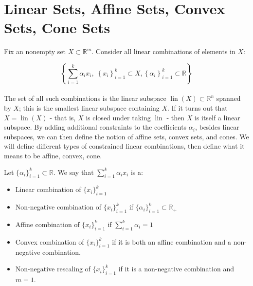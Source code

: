 \section{Linear Sets, Affine Sets, Convex Sets, Cone Sets}
\label{sect:011}

\paragraph{}Fix an nonempty set $X\subset \mathbb{R}^m$. Consider all linear combinations of elements in $X$:

\[
	\left\{\sum_{i=1}^k \alpha_i x_i,\; \left\{ x_i \right\}_{i=1}^k \subset X, \left\{\alpha_i\right\}_{i=1}^k\subset \mathbb{R}\right\}
\]

\paragraph{}The set of all such combinations is the linear subspace $\operatorname{lin}(X)\subset \mathbb{R}^n$ spanned by $X$; this is the smallest linear subspace containing $X$. If it turns out that $X=\operatorname{lin}(X)$ - that is, $X$ is closed under taking $\operatorname{lin}$ - then $X$ is itself a linear subspace. By adding additional constraints to the coefficients $\alpha_i$, besides linear subspaces, we can then define the notion of affine sets, convex sets, and cones. We will define different types of constrained linear combinations, then define what it means to be affine, convex, cone.

\begin{defn}[Combinations]\label{defn:011-comb}
	Let $\{\alpha_i\}_{i=1}^k\subset \mathbb{R}$. We say that $\sum_{i=1}^k \alpha_i x_i$ is a:
	\begin{itemize}
		\item Linear combination of $\{ x_i \}_{i=1}^k$
		\item Non-negative combination of $\{ x_i \}_{i=1}^k$ if $\{\alpha_i\}_{i=1}^k\subset \mathbb{R}_+$
		\item Affine combination of $\{ x_i \}_{i=1}^k$ if $\sum_{i=1}^k \alpha_i=1$
		\item Convex combination of $\{ x_i \}_{i=1}^k$ if it is both an affine combination and a non-negative combination.
		\item Non-negative rescaling of $\{ x_i \}_{i=1}^k$ if it is a non-negative combination and $m=1$.
	\end{itemize}
\end{defn}

